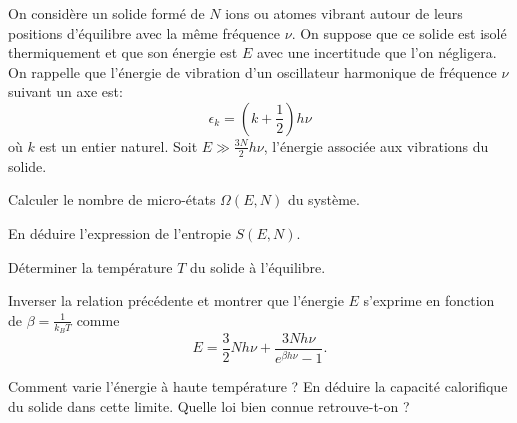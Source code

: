 On considère un solide formé de $N$ ions ou atomes vibrant autour de leurs positions d'équilibre avec la même fréquence $\nu$. On suppose que ce solide est isolé thermiquement et que son énergie est $E$ avec une incertitude que l'on négligera. On rappelle que l'énergie de vibration d'un oscillateur harmonique de fréquence $\nu$ suivant un axe est:
$$
\epsilon_k=(k+\frac{1}{2}) h \nu
$$
où $k$ est un entier naturel. Soit $E \gg \frac{3N}{2} h \nu$, l'énergie associée aux vibrations du solide.

\question
Calculer le nombre de micro-états $\Omega(E,N)$ du système.

\question
En déduire l'expression de l'entropie $S(E,N)$.

\question
Déterminer la température $T$ du solide à l'équilibre. 

\question
Inverser la relation précédente et montrer que l'énergie $E$ s'exprime en fonction de $\beta=\frac{1}{k_BT}$ comme
$$
E=\frac{3}{2} N h \nu + \frac{3Nh \nu}{e^{\beta h \nu}-1}. \nonumber
$$

\question
Comment varie l'énergie à haute température ? En déduire la capacité calorifique du solide dans cette limite. Quelle loi bien connue retrouve-t-on ?
